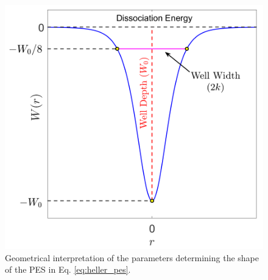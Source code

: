\documentclass[10pt,aps,onecolumn,superscriptaddress]{revtex4-2}
\begin{document}
\begin{figure}[htbp]
	\centering
	\includegraphics[scale=0.28]{heller_potFunc_new2.png}
	\caption{Geometrical interpretation of the parameters determining the shape of the PES in Eq. \eqref{eq:heller_pes}.}
	\label{fig:heller_pes}
\end{figure}
\end{document}
